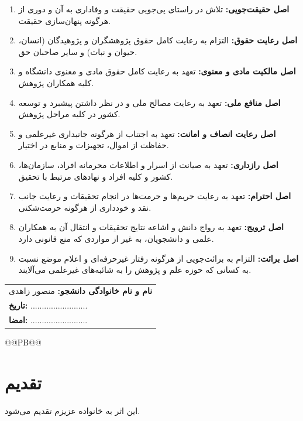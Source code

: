 \begin{enumerate}
    \item \textbf{اصل حقیقت‌جویی:} تلاش در راستای پی‌جویی حقیقت و وفاداری به آن و دوری از هرگونه پنهان‌سازی حقیقت.
    \item \textbf{اصل رعایت حقوق:} التزام به رعایت کامل حقوق پژوهشگران و پژوهیدگان (انسان، حیوان و نبات) و سایر صاحبان حق.
    \item \textbf{اصل مالکیت مادی و معنوی:} تعهد به رعایت کامل حقوق مادی و معنوی دانشگاه و کلیه همکاران پژوهش.
    \item \textbf{اصل منافع ملی:} تعهد به رعایت مصالح ملی و در نظر داشتن پیشبرد و توسعه کشور در کلیه مراحل پژوهش.
    \item \textbf{اصل رعایت انصاف و امانت:} تعهد به اجتناب از هرگونه جانبداری غیرعلمی و حفاظت از اموال، تجهیزات و منابع در اختیار.
    \item \textbf{اصل رازداری:} تعهد به صیانت از اسرار و اطلاعات محرمانه افراد، سازمان‌ها، کشور و کلیه افراد و نهادهای مرتبط با تحقیق.
    \item \textbf{اصل احترام:} تعهد به رعایت حریم‌ها و حرمت‌ها در انجام تحقیقات و رعایت جانب نقد و خودداری از هرگونه حرمت‌شکنی.
    \item \textbf{اصل ترویج:} تعهد به رواج دانش و اشاعه نتایج تحقیقات و انتقال آن به همکاران علمی و دانشجویان، به غیر از مواردی که منع قانونی دارد.
    \item \textbf{اصل برائت:} التزام به برائت‌جویی از هرگونه رفتار غیرحرفه‌ای و اعلام موضع نسبت به کسانی که حوزه علم و پژوهش را به شائبه‌های غیرعلمی می‌آلایند.
\end{enumerate}

\vspace{1cm}

\begin{flushleft}
\begin{tabular}{l}
\textbf{نام و نام خانوادگی دانشجو:} منصور زاهدی \\
\textbf{تاریخ:} ......................... \\
\textbf{امضا:} ......................... \\
\end{tabular}
\end{flushleft}



@@PB@@

        
\chapter*{تقدیم}
این اثر به خانواده عزیزم تقدیم می‌شود.


